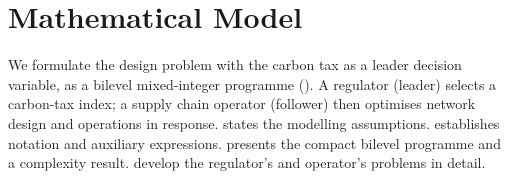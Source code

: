 
\section{Mathematical Model}
\label{sec:model}

We formulate the \CLSC design problem with the carbon tax as a leader
decision variable, as a bilevel mixed-integer programme (\BLMIP). A regulator (leader) selects a
carbon-tax index; a supply chain operator (follower) then optimises
network design and operations in response. 
states the modelling assumptions.  establishes
notation and auxiliary expressions.  presents the
compact bilevel programme and a complexity result.
 develop the regulator's and
operator's problems in detail.




